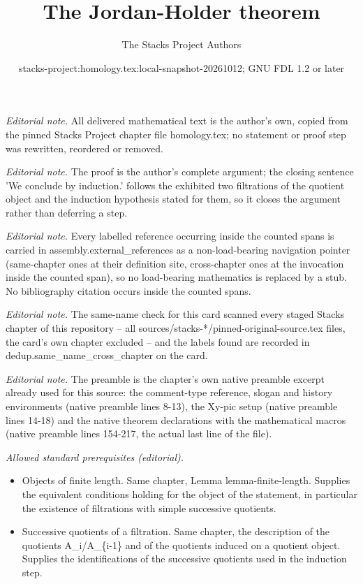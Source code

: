 \documentclass[10pt,a4paper]{amsart}
\title{The Jordan-Holder theorem}
\author{The Stacks Project Authors}
\date{stacks-project:homology.tex:local-snapshot-20261012; GNU FDL 1.2 or later}
\theoremstyle{plain}
\theoremstyle{definition}
\theoremstyle{remark}
\numberwithin{equation}{subsection}
\begin{document}
\maketitle
\noindent\textit{Editorial note.} All delivered mathematical text is the author's own, copied from the pinned Stacks Project chapter file homology.tex; no statement or proof step was rewritten, reordered or removed.\par\medskip
\noindent\textit{Editorial note.} The proof is the author's complete argument; the closing sentence 'We conclude by induction.' follows the exhibited two filtrations of the quotient object and the induction hypothesis stated for them, so it closes the argument rather than deferring a step.\par\medskip
\noindent\textit{Editorial note.} Every labelled reference occurring inside the counted spans is carried in assembly.external\_references as a non-load-bearing navigation pointer (same-chapter ones at their definition site, cross-chapter ones at the invocation inside the counted span), so no load-bearing mathematics is replaced by a stub. No bibliography citation occurs inside the counted spans.\par\medskip
\noindent\textit{Editorial note.} The same-name check for this card scanned every staged Stacks chapter of this repository -- all sources/stacks-*/pinned-original-source.tex files, the card's own chapter excluded -- and the labels found are recorded in dedup.same\_name\_cross\_chapter on the card.\par\medskip
\noindent\textit{Editorial note.} The preamble is the chapter's own native preamble excerpt already used for this source: the comment-type reference, slogan and history environments (native preamble lines 8-13), the Xy-pic setup (native preamble lines 14-18) and the native theorem declarations with the mathematical macros (native preamble lines 154-217, the actual last line of the file).\par\medskip
\noindent\textit{Allowed standard prerequisites (editorial).}\begin{itemize}
\item Objects of finite length. Same chapter, Lemma lemma-finite-length. Supplies the equivalent conditions holding for the object of the statement, in particular the existence of filtrations with simple successive quotients.
\item Successive quotients of a filtration. Same chapter, the description of the quotients A\_i/A\_\{i-1\} and of the quotients induced on a quotient object. Supplies the identifications of the successive quotients used in the induction step.
\end{itemize}\medskip
\end{document}

